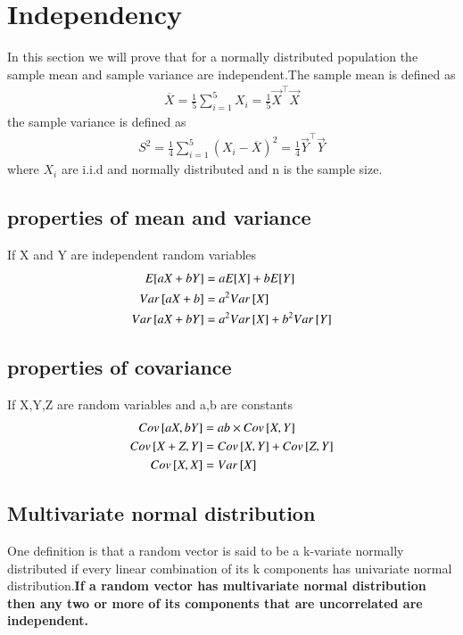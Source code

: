 \documentclass[journal,12pt,twocolumn]{IEEEtran}
\begin{document}
\section{Independency}
In this section we will prove that for a normally distributed population the sample mean and sample variance are independent.The sample mean is defined as
\begin{align}
    \overline{X}=\frac{1}{5}\sum_{i=1}^{5}X_i=\frac{1}{5}\vec{X}^{\top}\vec{X}
\end{align}
the sample variance is defined as
\begin{align}
    S^2=\frac{1}{4}\sum_{i=1}^{5}(X_i-\overline{X})^2=\frac{1}{4}\vec{Y}^{\top}\vec{Y}
\end{align}
where $X_i$ are i.i.d and normally distributed and n is the sample size.
\subsection{properties of mean and variance}
If X and Y are independent random variables
\begin{align}
    E[ aX+bY ]&=aE[ X ]+bE[ Y ]\\
    Var{}\left[aX+b\right]&=a^2Var{}\left[X\right]\\
    Var{}\left[aX+bY\right]&=a^2Var{}\left[X\right]+b^2Var{}\left[Y\right]
\end{align}
\subsection{properties of covariance}
If X,Y,Z are random variables and a,b are constants
\begin{align}
  Cov{}\left[aX,bY\right]&=ab\times Cov{}\left[X,Y\right]\\
Cov{}\left[X+Z,Y\right]&=Cov{}\left[X,Y\right]+Cov{}\left[Z,Y\right]\\
Cov{}\left[X,X\right]&=Var{}\left[X\right]
\end{align}
\subsection{Multivariate normal distribution}
One definition is that a random vector is said to be a k-variate normally distributed if every linear combination of its k components has univariate normal distribution.\textbf{If a random vector has multivariate normal distribution then any two or more of its components that are uncorrelated are independent.}
\end{document}
